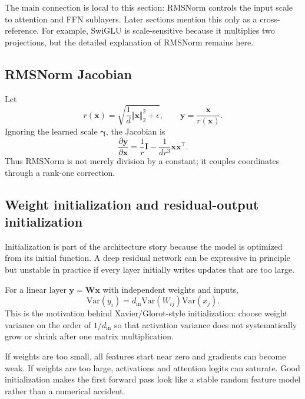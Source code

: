 \documentclass[11pt,a4paper]{article}
\theoremstyle{definition}
\theoremstyle{plain}
\newcommand{\vx}{\bm{x}}
\newcommand{\vy}{\bm{y}}
\newcommand{\mW}{\bm{W}}
\newcommand{\mI}{\bm{I}}
\newcommand{\Var}{\mathrm{Var}}
\begin{document}
\begin{connectionbox}
The main connection is local to this section: RMSNorm controls the input scale to attention and FFN sublayers. Later sections mention this only as a cross-reference. For example, SwiGLU is scale-sensitive because it multiplies two projections, but the detailed explanation of RMSNorm remains here.
\end{connectionbox}

\subsection{RMSNorm Jacobian}

Let
\begin{equation}
    r(\vx)=\sqrt{\frac{1}{d}\Vert\vx\Vert_2^2+\epsilon},
    \qquad
    \vy=\frac{\vx}{r(\vx)}.
\end{equation}
Ignoring the learned scale $\bm{\gamma}$, the Jacobian is
\begin{equation}\label{eq:rms_jacobian}
    \frac{\partial\vy}{\partial\vx}
    =\frac{1}{r}\mI-\frac{1}{d r^3}\vx\vx^\top.
\end{equation}
Thus RMSNorm is not merely division by a constant; it couples coordinates through a rank-one correction.

\subsection{Weight initialization and residual-output initialization}

Initialization is part of the architecture story because the model is optimized from its initial function. A deep residual network can be expressive in principle but unstable in practice if every layer initially writes updates that are too large.

For a linear layer $\vy=\mW\vx$ with independent weights and inputs,
\begin{equation}
    \Var(y_i)=d_{\mathrm{in}}\Var(W_{ij})\Var(x_j).
\end{equation}
This is the motivation behind Xavier/Glorot-style initialization: choose weight variance on the order of $1/d_{\mathrm{in}}$ so that activation variance does not systematically grow or shrink after one matrix multiplication.

\begin{intuitionbox}
If weights are too small, all features start near zero and gradients can become weak. If weights are too large, activations and attention logits can saturate. Good initialization makes the first forward pass look like a stable random feature model rather than a numerical accident.
\end{intuitionbox}
\end{document}

